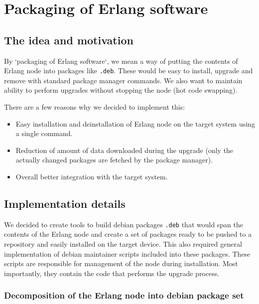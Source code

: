 \section{Packaging of Erlang software}

\subsection{The idea and motivation}

By `packaging of Erlang software`, we mean a way of putting the contents of Erlang node
into packages like {\tt .deb}. These would be easy to install, upgrade and remove with standard
package manager commands. We also want to maintain ability to perform upgrades without
stopping the node (hot code swapping).

There are a few reasons why we decided to implement this:

\begin{itemize}
\item Easy installation and deinstallation of Erlang node on the target system using a single command.
\item Reduction of amount of data downloaded during the upgrade (only the actually changed packages
are fetched by the package manager).
\item Overall better integration with the target system.
\end{itemize}

\subsection{Implementation details}

We decided to create tools to build debian packages {\tt .deb} that would span the contents
of the Erlang node and create a set of packages ready to be pushed to a repository and easily installed
on the target device. This also required general implementation of debian maintainer scripts
included into these packages. These scripts are responsible for management of the node
during installation. Most importantly, they contain the code that performs the upgrade process.

\subsubsection{Decomposition of the Erlang node into debian package set}

